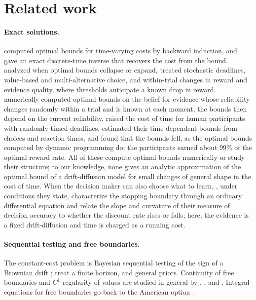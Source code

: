 \documentclass[11pt]{article}
\theoremstyle{definition}
\theoremstyle{remark}
\begin{document}
\section{Related work}
\label{sec:related}

\paragraph{Exact solutions.}
\citet{drugowitsch2012} computed optimal bounds for time-varying costs by backward induction, and
gave an exact discrete-time inverse that recovers the cost from the bound. \citet{malhotra2018}
analyzed when optimal bounds collapse or expand, \citet{frazier2007} treated stochastic deadlines,
\citet{tajima2016,tajima2019} value-based and multi-alternative choice, and
\citet{barendregt2022} within-trial changes in reward and evidence quality, where thresholds
anticipate a known drop in reward. \citet{drugowitsch2014} numerically computed optimal bounds on
the belief for evidence whose reliability changes randomly within a trial and is known at each
moment; the bounds then depend on the current reliability. \citet{kira2025} raised the cost of time for human participants
with randomly timed deadlines, estimated their time-dependent bounds from choices and reaction times,
and found that the bounds fell, as the optimal bounds computed by dynamic programming do; the
participants earned about 99\% of the optimal reward rate. All of these compute optimal bounds numerically or study their
structure; to our knowledge, none gives an analytic approximation of the optimal bound of a
drift-diffusion model for small changes of general shape in the cost of time. When the decision maker
can also choose what to learn, \citet{sannikov2026}, under conditions they state, characterize the
stopping boundary through an ordinary differential equation and relate the slope and curvature of
their measure of decision accuracy to whether the discount rate rises or falls; here, the evidence is
a fixed drift-diffusion and time is charged as a running cost.

\paragraph{Sequential testing and free boundaries.}
The constant-cost problem is Bayesian sequential testing of the sign of a Brownian drift
\citep{shiryaev1978,peskir2006}; \citet{gapeev2004} treat a finite horizon, and
\citet{ekstrom2015} general priors. Continuity of free boundaries and $C^1$ regularity of values
are studied in general by \citet{deangelis2015}, \citet{deangelis2020}, and
\citet{deangelis2024}. Integral equations for free boundaries go back to the American option
\citep{peskir2005b,peskir2006}.
\end{document}
